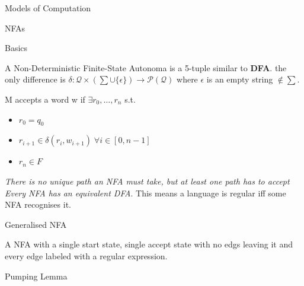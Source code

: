 \documentclass[12pt, letterpaper]{article}
\begin{document}
\begin{section}{Models of Computation}
  \begin{subsection}{NFAs}

    \begin{subsubsection}{Basics}

      A Non-Deterministic Finite-State Autonoma is a 5-tuple similar to
      \textbf{DFA}. the only difference is \(\delta: \mathscr{Q} \times
      (\sum \cup \{ \epsilon \}) \to \mathscr{P}(\mathscr{Q})\) where
      \(\epsilon\) is an empty string \(\notin \sum\).

      M accepts a word w if \(\exists r_{0}, \dots , r_{n}\) s.t.
      \begin{itemize}
        \item \(r_{0} = q_{0}\)
        \item
        \(r_{i + 1} \in \delta(r_{i}, w_{i + 1}) \; \forall i \in [0, n - 1]\)
        \item \(r_{n} \in F\)
      \end{itemize}

      \emph{There is no unique path an NFA must take, but at least one path has
        to accept} \\
      \emph{Every NFA has an equivalent DFA}. This means a language is regular
      iff some NFA recognises it.
    
    \end{subsubsection}

    \begin{subsubsection}{Generalised NFA}

      A NFA with a single start state, single accept state with no edgs leaving
      it and every edge labeled with a regular expression.

    \end{subsubsection}
  
  \end{subsection}

  \begin{subsection}{Pumping Lemma}


\end{subsection}
\end{section}
\end{document}
